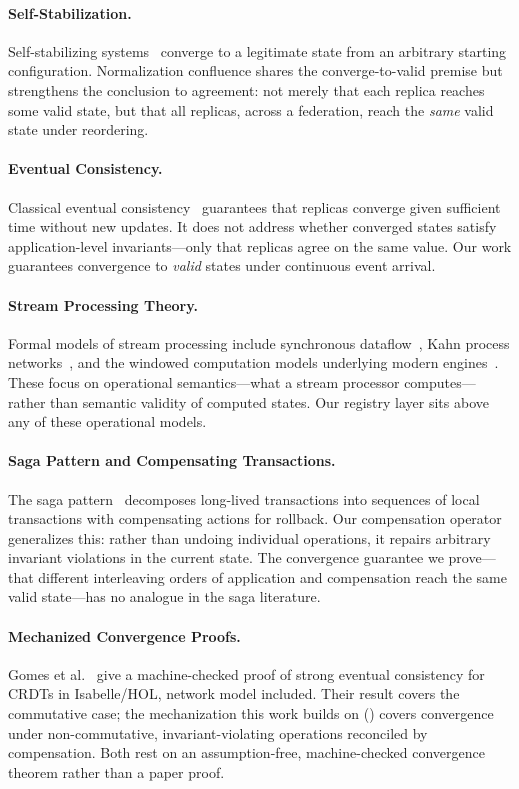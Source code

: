 \documentclass[11pt,a4paper]{article}
\theoremstyle{plain}
\theoremstyle{definition}
\theoremstyle{remark}
\renewcommand{\_}{\textunderscore\allowbreak}
\begin{document}
\paragraph{Self-Stabilization.}
Self-stabilizing systems~\cite{dijkstra1974} converge to a legitimate state from
an arbitrary starting configuration.  Normalization confluence shares the
converge-to-valid premise but strengthens the conclusion to agreement: not
merely that each replica reaches some valid state, but that all replicas, across
a federation, reach the \emph{same} valid state under reordering.

\paragraph{Eventual Consistency.}
Classical eventual consistency~\cite{vogels2009eventually} guarantees that
replicas converge given sufficient time without new updates.  It does not
address whether converged states satisfy application-level invariants---only
that replicas agree on the same value.  Our work guarantees convergence to
\emph{valid} states under continuous event arrival.

\paragraph{Stream Processing Theory.}
Formal models of stream processing include synchronous
dataflow~\cite{lee1987synchronous}, Kahn process
networks~\cite{kahn1974semantics}, and the windowed computation models
underlying modern engines~\cite{akidau2015dataflow}.  These focus on
operational semantics---what a stream processor computes---rather than semantic
validity of computed states.  Our registry layer sits above any of these
operational models.

\paragraph{Saga Pattern and Compensating Transactions.}
The saga pattern~\cite{garcia1987sagas} decomposes long-lived transactions into
sequences of local transactions with compensating actions for rollback.  Our
compensation operator generalizes this: rather than undoing individual
operations, it repairs arbitrary invariant violations in the current state.
The convergence guarantee we prove---that different interleaving orders of
application and compensation reach the same valid state---has no analogue in
the saga literature.

\paragraph{Mechanized Convergence Proofs.}
Gomes et al.~\cite{gomes2017verifying} give a machine-checked proof of strong
eventual consistency for CRDTs in Isabelle/HOL, network model included.  Their
result covers the commutative case; the mechanization this work builds on
() covers convergence under non-commutative,
invariant-violating operations reconciled by compensation.  Both rest on an
assumption-free, machine-checked convergence theorem rather than a paper proof.
\end{document}
